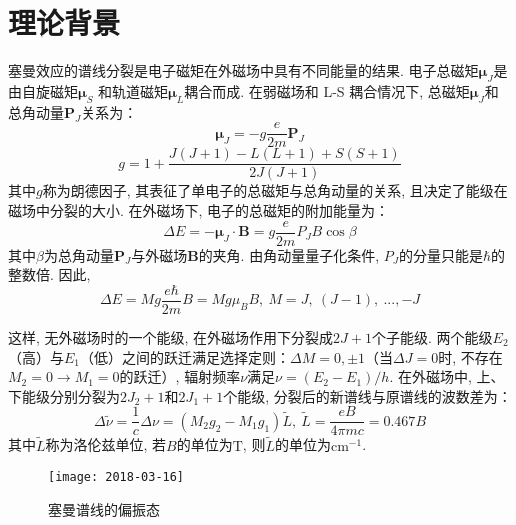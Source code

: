 \documentclass[aps,pre,12pt,preprint,onecolumn,showpacs,showkeys]{revtex4-1}
\begin{document}
\section{理论背景} 
塞曼效应的谱线分裂是电子磁矩在外磁场中具有不同能量的结果. 电子总磁矩$\bm{\mu}_J$是由自旋磁矩$\bm{\mu}_S$ 和轨道磁矩$\bm{\mu}_L$耦合而成. 在弱磁场和 L-S 耦合情况下, 总磁矩$\bm{\mu}_J$和总角动量$\bm{P}_J$关系为：
\begin{equation}
\bm{\mu}_J=-g\frac{e}{2m}\bm{P}_J
\end{equation}
\begin{equation}
g=1+\frac{J(J+1)-L(L+1)+S(S+1)}{2J(J+1)}
\end{equation}
其中$g$称为朗德因子, 其表征了单电子的总磁矩与总角动量的关系, 且决定了能级在磁场中分裂的大小.
在外磁场下, 电子的总磁矩的附加能量为：
\begin{equation}
\Delta E=-\bm{\mu}_J\cdot\bm{B}=g\frac{e}{2m}P_J B \cos{\beta}
\end{equation}
其中$\beta$为总角动量$\bm{P}_J$与外磁场$\bm{B}$的夹角. 由角动量量子化条件, $P_J$的分量只能是$\hbar$的整数倍. 因此, 
\begin{equation}
\Delta E=M g \frac{e \hbar}{2m}B=M g \mu_B B,\ M=J,\ (J-1),\ ...,-J
\end{equation}

这样, 无外磁场时的一个能级, 在外磁场作用下分裂成$2J+1$个子能级. 
两个能级$E_2$（高）与$E_1$（低）之间的跃迁满足选择定则：$\Delta M=0, \pm1$（当$\Delta J=0$时, 不存在$M_2=0 \to M_1=0$的跃迁）, 辐射频率$\nu$满足$\nu=(E_2-E_1)/h$. 在外磁场中, 上、下能级分别分裂为$2 J_2+1$和$2 J_1+1$个能级, 分裂后的新谱线与原谱线的波数差为：
\begin{equation}
\Delta \tilde \nu=\frac{1}{c}\Delta \nu=(M_2 g_2-M_1 g_1)\tilde L,\ \tilde L =\frac{eB}{4\pi m c}=0.467 B
\end{equation}
其中$\tilde L$称为洛伦兹单位, 若$B$的单位为$\mathrm T$, 则$\tilde L$的单位为$\mathrm{cm}^{-1}$. 
\begin{figure}[h]
\centering
\texttt{[image: 2018-03-16]}
\caption{\label{fig:塞曼谱线的偏振态}%
塞曼谱线的偏振态}
\end{figure}
\end{document}
